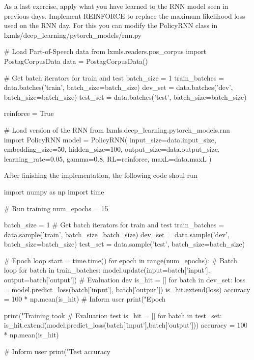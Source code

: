 \begin{exercise}
As a last exercise, apply what you have learned to the RNN model seen in previous days. Implement REINFORCE to replace the maximum likelihood loss used on the RNN day. For this you can modify the PolicyRNN class in lxmls/deep\_learning/pytorch\_models/rnn.py 
\begin{python}
# Load Part-of-Speech data 
from lxmls.readers.pos_corpus import PostagCorpusData
data = PostagCorpusData()

# Get batch iterators for train and test
batch_size = 1
train_batches = data.batches('train', batch_size=batch_size)
dev_set = data.batches('dev', batch_size=batch_size)
test_set = data.batches('test', batch_size=batch_size)
\end{python}
\begin{python}
reinforce = True

# Load version of the RNN 
from lxmls.deep_learning.pytorch_models.rnn import PolicyRNN
model = PolicyRNN(
    input_size=data.input_size,
    embedding_size=50,
    hidden_size=100,
    output_size=data.output_size,
    learning_rate=0.05,
    gamma=0.8,
    RL=reinforce,
    maxL=data.maxL
)
\end{python}

After finishing the implementation, the following code shoul run
\begin{python}
import numpy as np
import time

# Run training
num_epochs = 15

batch_size = 1
# Get batch iterators for train and test
train_batches = data.sample('train', batch_size=batch_size)
dev_set = data.sample('dev', batch_size=batch_size)
test_set = data.sample('test', batch_size=batch_size)

# Epoch loop
start = time.time()
for epoch in range(num_epochs):
    # Batch loop
    for batch in train_batches:
        model.update(input=batch['input'], output=batch['output'])
    # Evaluation dev
    is_hit = []
    for batch in dev_set:
        loss = model.predict_loss(batch['input'], batch['output'])
        is_hit.extend(loss)
    accuracy = 100 * np.mean(is_hit)
    # Inform user
    print("Epoch %

print("Training took %
# Evaluation test
is_hit = []
for batch in test_set:
    is_hit.extend(model.predict_loss(batch['input'],batch['output']))
accuracy = 100 * np.mean(is_hit)

# Inform user
print("Test accuracy %
\end{python}
\end{exercise}
